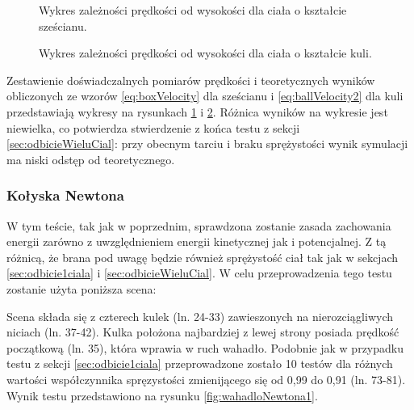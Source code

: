 \begin{figure}
\centering

\caption{Wykres zależności prędkości od wysokości dla ciała o kształcie
sześcianu.}
\label{fig:boxDiagram}
\end{figure}

\begin{figure}
\centering

\caption{Wykres zależności prędkości od wysokości dla ciała o kształcie
kuli.}
\label{fig:ballDiagram}
\end{figure}

Zestawienie doświadczalnych pomiarów prędkości i teoretycznych wyników
obliczonych ze wzorów \ref{eq:boxVelocity} dla sześcianu i
\ref{eq:ballVelocity2} dla kuli przedstawiają wykresy na rysunkach
\ref{fig:boxDiagram} i \ref{fig:ballDiagram}. Różnica wyników na wykresie jest
niewielka, co potwierdza stwierdzenie z końca testu z sekcji
\ref{sec:odbicieWieluCial}: przy obecnym tarciu i braku sprężystości wynik
symulacji ma niski odstęp od teoretycznego.

\subsubsection{Kołyska Newtona} \label{sec:kolyskaNewtona}
W tym teście, tak jak w poprzednim, sprawdzona zostanie zasada zachowania
energii zarówno z uwzględnieniem energii kinetycznej jak i potencjalnej.
Z tą różnicą, że brana pod uwagę będzie również sprężystość ciał tak jak w
sekcjach \ref{sec:odbicie1ciala} i \ref{sec:odbicieWieluCial}. W celu
przeprowadzenia tego testu zostanie użyta poniższa scena:



Scena składa się z czterech kulek (ln. 24-33) zawieszonych na nierozciągliwych
niciach (ln. 37-42). Kulka położona najbardziej z lewej strony posiada prędkość
początkową (ln. 35), która wprawia w ruch wahadło. Podobnie jak w przypadku
testu z sekcji \ref{sec:odbicie1ciala} przeprowadzone zostało 10 testów dla
różnych wartości współczynnika spręzystości zmienijącego się od 0,99 do 0,91
(ln.
73-81). Wynik testu przedstawiono na rysunku \ref{fig:wahadloNewtona1}.

